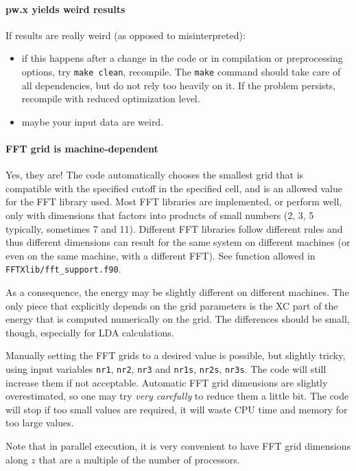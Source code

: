 \documentclass[12pt,a4paper]{article}
\begin{document}
\paragraph{pw.x yields weird results}
If results are really weird (as opposed to misinterpreted):
\begin{itemize}
\item if this happens after a change in the code or in compilation or
  preprocessing options, try \texttt{make clean}, recompile. The \texttt{make}
  command should take care of all dependencies, but do not rely too
  heavily on it. If the problem persists, recompile with
  reduced optimization level.  
\item maybe your input data are weird.
\end{itemize}

\paragraph{FFT grid is machine-dependent}
Yes, they are! The code automatically chooses the smallest grid that
is compatible with the 
specified cutoff in the specified cell, and is an allowed value for the FFT
library used. Most FFT libraries are implemented, or perform well, only
with dimensions that factors into products of small numbers (2, 3, 5 typically,
sometimes 7 and 11). Different FFT libraries follow different rules and thus
different dimensions can result for the same system on different machines (or
even on the same machine, with a different FFT). See function allowed in
\texttt{FFTXlib/fft\_support.f90}.

As a consequence, the energy may be slightly different on different machines. 
The only piece that explicitly depends on the grid parameters is
the XC part of the energy that is computed numerically on the grid. The
differences should be small, though, especially for LDA calculations.

Manually setting the FFT grids to a desired value is possible, but slightly
tricky, using input variables \texttt{nr1}, \texttt{nr2}, \texttt{nr3} and 
\texttt{nr1s}, \texttt{nr2s}, \texttt{nr3s}. The
code will still increase them if not acceptable. Automatic FFT grid 
dimensions are slightly overestimated, so one may try {\em very carefully}
to reduce
them a little bit. The code will stop if too small values are required, it will
waste CPU time and memory for too large values.
    
Note that in parallel execution, it is very convenient to have FFT grid
dimensions along $z$ that are a multiple of the number of processors.
\end{document}
